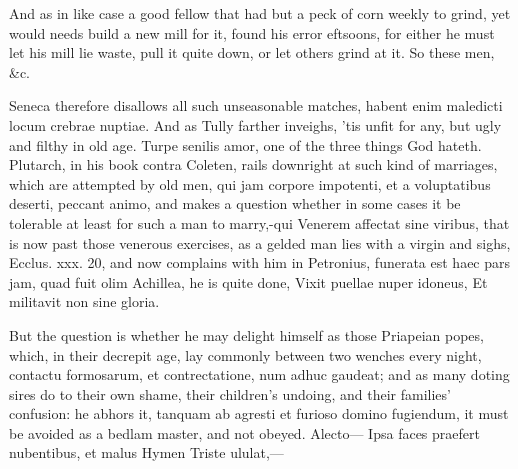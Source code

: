 {And as in like case a good fellow that had but a peck of corn weekly to
grind, yet would needs build a new mill for it, found his error
eftsoons, for either he must let his mill lie waste, pull it quite
down, or let others grind at it. So these men, \&c.

Seneca therefore disallows all such unseasonable matches, habent enim
maledicti locum crebrae nuptiae. And as Tully farther inveighs,
'tis unfit for any, but ugly and filthy in old age. Turpe senilis amor,
one of the three things God hateth. Plutarch, in his book contra
Coleten, rails downright at such kind of marriages, which are attempted
by old men, qui jam corpore impotenti, et a voluptatibus deserti,
peccant animo, and makes a question whether in some cases it be
tolerable at least for such a man to marry,-qui Venerem affectat sine
viribus, that is now past those venerous exercises, as a gelded man
lies with a virgin and sighs, Ecclus. xxx. 20, and now complains with
him in Petronius, funerata est haec pars jam, quad fuit olim Achillea,
he is quite done,
Vixit puellae nuper idoneus,
Et militavit non sine gloria.

But the question is whether he may delight himself as those Priapeian
popes, which, in their decrepit age, lay commonly between two wenches
every night, contactu formosarum, et contrectatione, num adhuc gaudeat;
and as many doting sires do to their own shame, their children's
undoing, and their families' confusion: he abhors it, tanquam ab
agresti et furioso domino fugiendum, it must be avoided as a bedlam
master, and not obeyed.
Alecto---
Ipsa faces praefert nubentibus, et malus Hymen
Triste ululat,---

}
